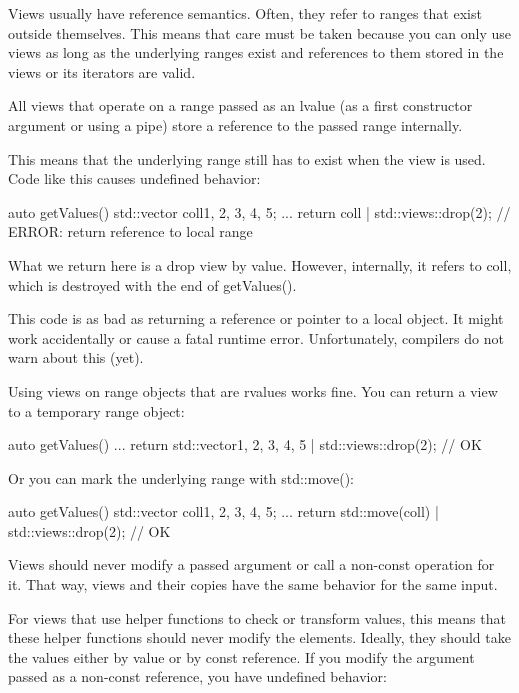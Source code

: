 
Views usually have reference semantics. Often, they refer to ranges that exist outside themselves. This means that care must be taken because you can only use views as long as the underlying ranges exist and references to them stored in the views or its iterators are valid.


All views that operate on a range passed as an lvalue (as a first constructor argument or using a pipe) store a reference to the passed range internally.

This means that the underlying range still has to exist when the view is used. Code like this causes undefined behavior:

\begin{cpp}
auto getValues()
{
	std::vector coll{1, 2, 3, 4, 5};
	...
	return coll | std::views::drop(2); // ERROR: return reference to local range
}
\end{cpp}

What we return here is a drop view by value. However, internally, it refers to coll, which is destroyed with the end of getValues().

This code is as bad as returning a reference or pointer to a local object. It might work accidentally or cause a fatal runtime error. Unfortunately, compilers do not warn about this (yet).

Using views on range objects that are rvalues works fine. You can return a view to a temporary range object:

\begin{cpp}
auto getValues()
{
	...
	return std::vector{1, 2, 3, 4, 5} | std::views::drop(2); // OK
}
\end{cpp}

Or you can mark the underlying range with std::move():

\begin{cpp}
auto getValues()
{
	std::vector coll{1, 2, 3, 4, 5};
	...
	return std::move(coll) | std::views::drop(2); // OK
}
\end{cpp}


Views should never modify a passed argument or call a non-const operation for it. That way, views and their copies have the same behavior for the same input.

For views that use helper functions to check or transform values, this means that these helper functions should never modify the elements. Ideally, they should take the values either by value or by const reference. If you modify the argument passed as a non-const reference, you have undefined behavior:

